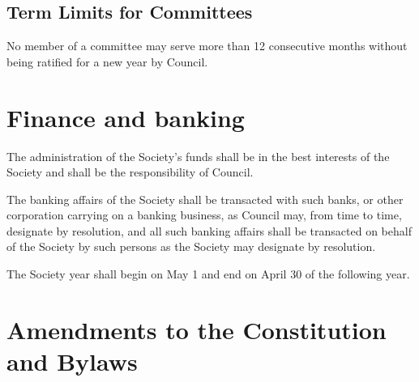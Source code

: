 \subsection{Term Limits for Committees}
	\begin{longenum}[label*=\thesubsection.\arabic*., align=left]
	\item No member of a committee may serve more than 12 consecutive months without being ratified for a new year by Council.
\end{longenum}
\newpage

\section{Finance and banking}

	\begin{longenum}[label*=\thesection.\arabic*., align=left]
	\item The administration of the Society's funds shall be in the best interests of the Society and shall be the responsibility of Council.
    \item The banking affairs of the Society shall be transacted with such banks, or other corporation carrying on a banking business, as Council may, from time to time, designate by resolution, and all such banking affairs shall be transacted on behalf of the Society by such persons as the Society may designate by resolution. 
    \item The Society year shall begin on May 1 and end on April 30 of the following year. 
\end{longenum}
\renewcommand*{\theenumi}{\thesubsection.\arabic{enumi}}

\newpage

\section {Amendments to the Constitution and Bylaws}

